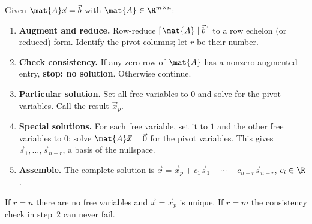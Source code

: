 \begin{focusbox}
Given $\mat{A}\vec{x}=\vec{b}$ with $\mat{A}\in\R^{m\times n}$:
\begin{enumerate}
  \item \textbf{Augment and reduce.} Row-reduce $[\,\mat{A}\mid\vec{b}\,]$ to a
    row echelon (or reduced) form. Identify the pivot columns; let $r$ be their number.
  \item \textbf{Check consistency.} If any zero row of $\mat{A}$ has a nonzero augmented
    entry, \textbf{stop: no solution}. Otherwise continue.
  \item \textbf{Particular solution.} Set all free variables to $0$ and solve for the pivot
    variables. Call the result $\vec{x}_p$.
  \item \textbf{Special solutions.} For each free variable, set it to $1$ and the other
    free variables to $0$; solve $\mat{A}\vec{x}=\vec{0}$ for the pivot variables. This
    gives $\vec{s}_1,\dots,\vec{s}_{n-r}$, a basis of the nullspace.
  \item \textbf{Assemble.} The complete solution is
    $\vec{x}=\vec{x}_p+c_1\vec{s}_1+\cdots+c_{n-r}\vec{s}_{n-r}$, $c_i\in\R$.
\end{enumerate}
If $r=n$ there are no free variables and $\vec{x}=\vec{x}_p$ is unique. If $r=m$ the
consistency check in step~2 can never fail.
\end{focusbox}

